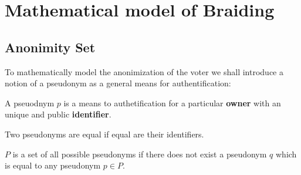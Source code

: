 \documentclass[12pt]{article}
\newenvironment{definition}[2][Definition]{\begin{trivlist}
\item[\hskip \labelsep {\bfseries #1}\hskip \labelsep {\bfseries #2.}]}{\end{trivlist}}
\begin{document}

% 

\section*{Mathematical model of Braiding}

\subsection*{Anonimity Set}

To mathematically model the anonimization of the voter we shall introduce a notion of a pseudonym as a general means for authentification:
\begin{definition}{(pseudonym)} 
A pseuodnym $p$ is a means to authetification for a particular {\bf owner} with an unique and public {\bf identifier}.
\end{definition}

\begin{definition}{(pseudonym equality)}
  Two pseudonyms are equal if equal are their identifiers.
\end{definition}

\begin{definition}{(pseudonym set)}
  $P$ is a set of all possible pseudonyms if there does not exist a pseudonym $q$ which is equal to any pseudonym $p \in P$.
\end{definition}
\end{document}
